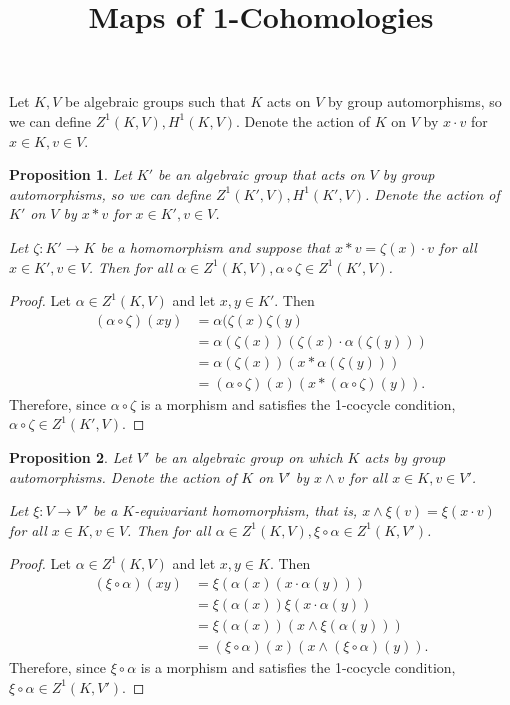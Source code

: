 \documentclass[12pt, a4paper]{amsart}
\newtheorem{prop}{Proposition}
\begin{document}
\title{Maps of 1-Cohomologies}
\maketitle

Let $K, V$ be algebraic groups such that $K$ acts on $V$ by group automorphisms, so we can define $Z^1(K, V), H^1(K, V)$. Denote the action of $K$ on $V$ by $x \cdot v$ for $x \in K, v \in V$.

\begin{prop} \label{zeta}
	Let $K'$ be an algebraic group that acts on $V$ by group automorphisms, so we can define $Z^1(K', V), H^1(K', V)$. Denote the action of $K'$ on $V$ by $x \ast v$ for $x \in K', v \in V$.

	Let $\zeta:K'\rightarrow K$ be a homomorphism and suppose that $x \ast v = \zeta(x) \cdot v$ for all $x \in K', v \in V$. Then for all $\alpha \in Z^1(K, V), \alpha \circ \zeta \in Z^1(K', V)$.
\end{prop}
\begin{proof}
	Let $\alpha \in Z^1(K, V)$ and let $x, y \in K'$. Then
	\begin{align*}
		(\alpha \circ \zeta)(xy) &= \alpha(\zeta(x)\zeta(y) \\
			&= \alpha(\zeta(x))\left(\zeta(x) \cdot \alpha(\zeta(y))\right) \\
			&= \alpha(\zeta(x))\left(x \ast \alpha(\zeta(y))\right) \\
			&= (\alpha \circ \zeta)(x)\left(x \ast (\alpha \circ \zeta)(y)\right).
	\end{align*}
	Therefore, since $\alpha \circ \zeta$ is a morphism and satisfies the 1-cocycle condition, $\alpha \circ \zeta \in Z^1(K', V)$.
\end{proof}

\begin{prop} \label{xi}
	Let $V'$ be an algebraic group on which $K$ acts by group automorphisms. Denote the action of $K$ on $V'$ by $x \wedge v$ for all $x \in K, v \in V'$.

	Let $\xi: V \rightarrow V'$ be a $K$-equivariant homomorphism, that is, $x \wedge \xi(v) = \xi(x \cdot v)$ for all $x \in K, v \in V$. Then for all $\alpha \in Z^1(K, V), \xi \circ \alpha \in Z^1(K, V')$.
\end{prop}
\begin{proof}
	Let $\alpha \in Z^1(K, V)$ and let $x, y \in K$. Then
	\begin{align*}
		(\xi \circ \alpha)(xy) &= \xi\left(\alpha(x)(x \cdot \alpha(y))\right) \\
			&= \xi(\alpha(x))\xi(x \cdot \alpha(y)) \\
			&= \xi(\alpha(x))\left(x \wedge \xi(\alpha(y))\right) \\
			&= (\xi \circ \alpha)(x)\left(x \wedge (\xi \circ \alpha)(y)\right).
	\end{align*}
	Therefore, since $\xi \circ \alpha$ is a morphism and satisfies the 1-cocycle condition, $\xi \circ \alpha \in Z^1(K, V')$.
\end{proof}
\end{document}
